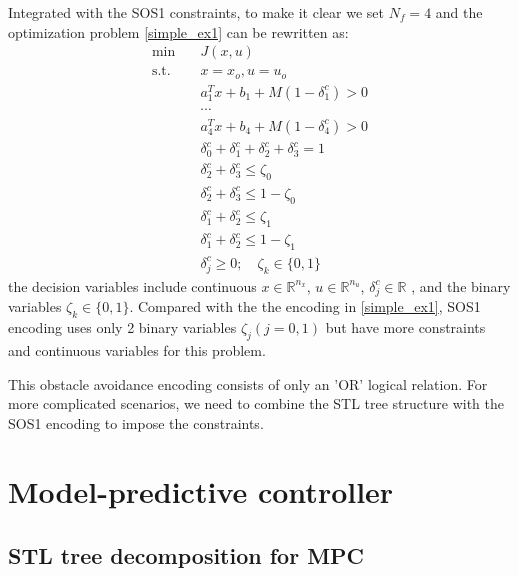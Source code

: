 \documentclass[a4paper]{report}
\begin{document}
Integrated with the SOS1 constraints, to make it clear we set $N_f = 4$ and the optimization problem \ref{simple_ex1} can be rewritten as:
\begin{equation}
    \begin{aligned}
        \min \quad       &  J(x,u)\\
        \text{s.t.}\quad &
        x =x_o, u= u_o                        
         \\
                         & a_1^Tx +b_1 +M(1-\delta_1^c)>0                         \\
                         & \cdots \\
                         & a_4^Tx +b_4 +M(1-\delta_4^c)>0                         \\
                         & \delta_0^c+ \delta_1^c+\delta_2^c+\delta_3^c =1
                         \\
                         & \delta_2^c+ \delta_3^c \leq \zeta_0
                         \\
                         & \delta_2^c+ \delta_3^c \leq 1-\zeta_0
                         \\& \delta_1^c+ \delta_2^c \leq \zeta_1
                         \\& \delta_1^c+ \delta_2^c \leq 1-\zeta_1
                         \\& \delta_j^c \geq 0; \quad \zeta_k \in \{0,1\}
    \end{aligned}
\end{equation}
the decision variables include continuous $x \in \mathbb{R}^{n_x}$, $u \in \mathbb{R}^{n_u}$, $\delta_j^c \in \mathbb{R}$ , and the binary variables $\zeta_k \in \{0,1\}$. Compared with the the encoding in \ref{simple_ex1}, SOS1 encoding uses only 2 binary variables $\zeta_j (j=0,1)$ but have more constraints and continuous variables for this problem.

This obstacle avoidance encoding consists of only an 'OR' logical relation. For more complicated scenarios, we need to combine the STL tree structure with the SOS1 encoding to impose the constraints.

\section{Model-predictive controller}
\subsection{ STL tree decomposition for MPC}
\label{Decomposition for MPC}
\end{document}
